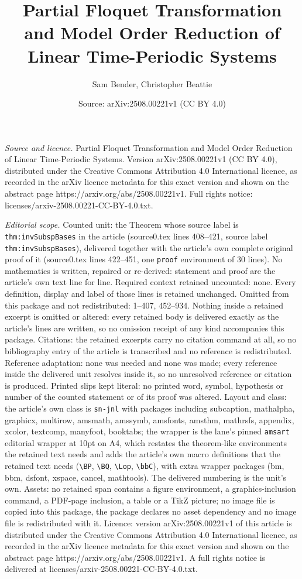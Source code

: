 \documentclass[10pt,a4paper]{amsart}
\title[Partial Floquet Transformation and Model Order Reduction of ]{Partial Floquet Transformation and Model Order Reduction of Linear Time-Periodic Systems}
\author{Sam Bender, Christopher Beattie}
\date{Source: arXiv:2508.00221v1 (CC BY 4.0)}
\begin{document}
\maketitle

\noindent\emph{Source and licence.} Partial Floquet Transformation and Model Order Reduction of Linear Time-Periodic Systems. Version arXiv:2508.00221v1 (CC BY 4.0), distributed under the Creative Commons Attribution 4.0 International licence, as recorded in the arXiv licence metadata for this exact version and shown on the abstract page https://arxiv.org/abs/2508.00221v1. Full rights notice: licenses/arxiv-2508.00221-CC-BY-4.0.txt.\par\smallskip

\noindent\textit{Editorial scope.} Counted unit: the Theorem whose source label is \texttt{thm:invSubspBases} in the article (source0.tex lines 408--421, source label \texttt{thm:invSubspBases}), delivered together with the article's own complete original proof of it (source0.tex lines 422--451, one \texttt{proof} environment of 30 lines). No mathematics is written, repaired or re-derived: statement and proof are the article's own text line for line. Required context retained uncounted: none. Every definition, display and label of those lines is retained unchanged. Omitted from this package and not redistributed: 1--407, 452--934. Nothing inside a retained excerpt is omitted or altered: every retained body is delivered exactly as the article's lines are written, so no omission receipt of any kind accompanies this package. Citations: the retained excerpts carry no citation command at all, so no bibliography entry of the article is transcribed and no reference is redistributed. Reference adaptation: none was needed and none was made; every reference inside the delivered unit resolves inside it, so no unresolved reference or citation is produced. Printed slips kept literal: no printed word, symbol, hypothesis or number of the counted statement or of its proof was altered. Layout and class: the article's own class is \texttt{sn-jnl} with packages including subcaption, mathalpha, graphicx, multirow, amsmath, amssymb, amsfonts, amsthm, mathrsfs, appendix, xcolor, textcomp, manyfoot, booktabs; the wrapper is the lane's pinned \texttt{amsart} editorial wrapper at 10pt on A4, which restates the theorem-like environments the retained text needs and adds the article's own macro definitions that the retained text needs (\texttt{\textbackslash BP}, \texttt{\textbackslash BQ}, \texttt{\textbackslash Lop}, \texttt{\textbackslash bbC}), with extra wrapper packages (bm, bbm, dsfont, xspace, cancel, mathtools). The delivered numbering is the unit's own. Assets: no retained span contains a figure environment, a graphics-inclusion command, a PDF-page inclusion, a table or a TikZ picture; no image file is copied into this package, the package declares no asset dependency and no image file is redistributed with it. Licence: version arXiv:2508.00221v1 of this article is distributed under the Creative Commons Attribution 4.0 International licence, as recorded in the arXiv licence metadata for this exact version and shown on the abstract page https://arxiv.org/abs/2508.00221v1. A full rights notice is delivered at licenses/arxiv-2508.00221-CC-BY-4.0.txt. 
\end{document}
